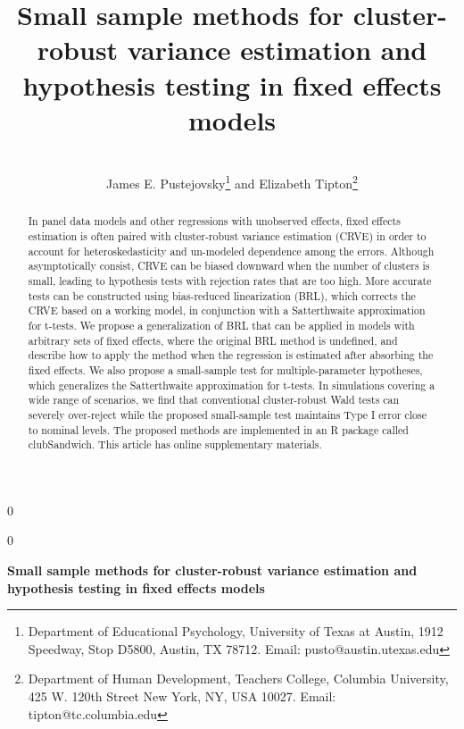 \documentclass[12pt]{article}\usepackage[]{graphicx}\usepackage[]{color}
\newcommand{\blind}{0}
\begin{document}
\def\spacingset#1{\renewcommand{\baselinestretch}%
{#1}\small\normalsize} \spacingset{1}



\blind
{
  \title{\bf Small sample methods for cluster-robust variance estimation and hypothesis testing in fixed effects models}                     
  \author{\\James E. Pustejovsky\thanks{Department of Educational Psychology, University of Texas at Austin, 1912 Speedway, Stop D5800, Austin, TX 78712. Email: pusto@austin.utexas.edu}
    \hspace{.2cm}and\hspace{.2cm}
    Elizabeth Tipton\thanks{Department of Human Development, Teachers College, Columbia University, 425 W. 120th Street
New York, NY, USA 10027. Email: tipton@tc.columbia.edu}
    }
  \maketitle
} \fi

\blind
{
  \bigskip
  \bigskip
  \bigskip
  \begin{center}
    {\LARGE\bf Small sample methods for cluster-robust variance estimation and hypothesis testing in fixed effects models}
\end{center}
  \medskip
} \fi

\bigskip


\begin{abstract}
In panel data models and other regressions with unobserved effects, fixed effects estimation is often paired with cluster-robust variance estimation (CRVE) in order to account for heteroskedasticity and un-modeled dependence among the errors. 
Although asymptotically consist, CRVE can be biased downward when the number of clusters is small, leading to hypothesis tests with rejection rates that are too high. 
More accurate tests can be constructed using bias-reduced linearization (BRL), which corrects the CRVE based on a working model, in conjunction with a Satterthwaite approximation for t-tests. 
We propose a generalization of BRL that can be applied in models with arbitrary sets of fixed effects, where the original BRL method is undefined, and describe how to apply the method when the regression is estimated after absorbing the fixed effects. 
We also propose a small-sample test for multiple-parameter hypotheses, which generalizes the Satterthwaite approximation for t-tests. 
In simulations covering a wide range of scenarios, we find that conventional cluster-robust Wald tests can severely over-reject while the proposed small-sample test maintains Type I error close to nominal levels. 
The proposed methods are implemented in an R package called clubSandwich. 
This article has online supplementary materials.
\end{abstract}
\end{document}
